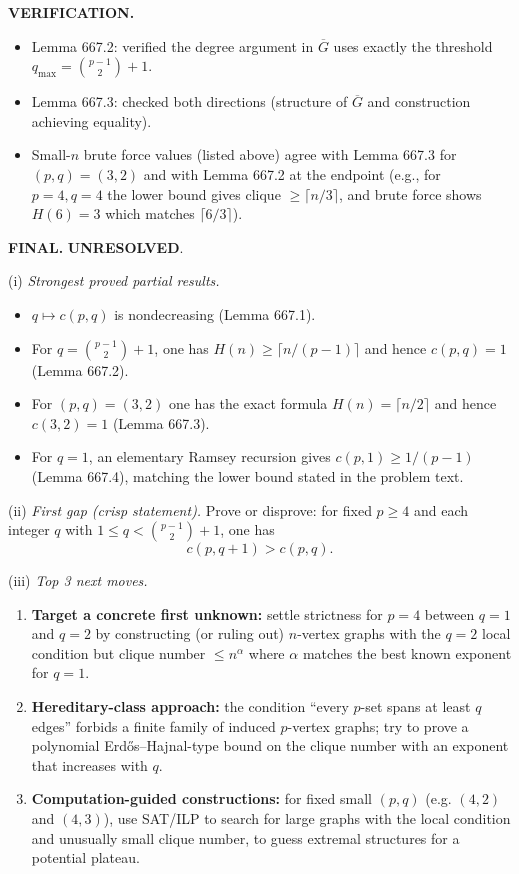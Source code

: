 \bigskip
\noindent\textbf{VERIFICATION.}
\begin{itemize}
\item Lemma 667.2: verified the degree argument in $\overline{G}$ uses exactly the threshold $q_\max=\binom{p-1}{2}+1$.
\item Lemma 667.3: checked both directions (structure of $\overline{G}$ and construction achieving equality).
\item Small-$n$ brute force values (listed above) agree with Lemma 667.3 for $(p,q)=(3,2)$ and with Lemma 667.2 at the endpoint (e.g., for $p=4,q=4$ the lower bound gives clique $\ge \lceil n/3\rceil$, and brute force shows $H(6)=3$ which matches $\lceil 6/3\rceil$).
\end{itemize}

\bigskip
\noindent\textbf{FINAL.} \textbf{UNRESOLVED}.

\smallskip
\noindent(i) \emph{Strongest proved partial results.}
\begin{itemize}
\item $q\mapsto c(p,q)$ is nondecreasing (Lemma 667.1).
\item For $q=\binom{p-1}{2}+1$, one has $H(n)\ge \lceil n/(p-1)\rceil$ and hence $c(p,q)=1$ (Lemma 667.2).
\item For $(p,q)=(3,2)$ one has the exact formula $H(n)=\lceil n/2\rceil$ and hence $c(3,2)=1$ (Lemma 667.3).
\item For $q=1$, an elementary Ramsey recursion gives $c(p,1)\ge 1/(p-1)$ (Lemma 667.4), matching the lower bound stated in the problem text.
\end{itemize}

\noindent(ii) \emph{First gap (crisp statement).}
Prove or disprove: for fixed $p\ge 4$ and each integer $q$ with $1\le q<\binom{p-1}{2}+1$, one has
\[
c(p,q+1) > c(p,q).
\]

\noindent(iii) \emph{Top 3 next moves.}
\begin{enumerate}
\item \textbf{Target a concrete first unknown:} settle strictness for $p=4$ between $q=1$ and $q=2$ by constructing (or ruling out) $n$-vertex graphs with the $q=2$ local condition but clique number $\le n^{\alpha}$ where $\alpha$ matches the best known exponent for $q=1$.
\item \textbf{Hereditary-class approach:} the condition ``every $p$-set spans at least $q$ edges'' forbids a finite family of induced $p$-vertex graphs; try to prove a polynomial Erd\H{o}s--Hajnal-type bound on the clique number with an exponent that increases with $q$.
\item \textbf{Computation-guided constructions:} for fixed small $(p,q)$ (e.g. $(4,2)$ and $(4,3)$), use SAT/ILP to search for large graphs with the local condition and unusually small clique number, to guess extremal structures for a potential plateau.
\end{enumerate}

